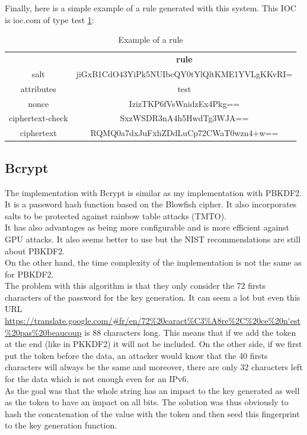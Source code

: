 \documentclass{eplmastersthesis}
\begin{document}
Finally, here is a simple example of a rule generated with this system. This IOC is ioc.com of type test \ref{Example-rule-pbkdf2}:
\begin{table}[]
\centering
\caption{Example of a rule}
\label{Example-rule-pbkdf2}
\begin{tabular}{cc}
{\textbf{}}  & {\textbf{rule}}                          \\
salt             & jiGxB1CdO43YiPk5NUIbcQY0tYlQltKME1YVLgKKvRI= \\
attributes       & test                                         \\
nonce            & IzizTKP6fVsWnidzEx4Pkg==                     \\
ciphertext-check & SxzWSDR3nA4h5HwdTg3WJA==                     \\
ciphertext       & RQMQ0a7dxJuFxhZDdLuCp72CWaT0wzn4+w==        
\end{tabular}
\end{table}

\subsection{Bcrypt}
The implementation with Bcrypt is similar as my implementation with PBKDF2. It is a password hash function based on the Blowfish cipher. It also incorporates salts to be protected against rainbow table attacks (TMTO).\\
It has also advantages as being more configurable and is more efficient against GPU attacks. It also seems better to use but the NIST recommendations are still about PBKDF2.\\

On the other hand, the time complexity of the implementation is not the same as for PBKDF2.\\
The problem with this algorithm is that they only consider the 72 firsts characters of the password for the key generation. It can seem a lot but even this URL \url{https://translate.google.com/#fr/en/72\%20caract\%C3\%A8re\%2C\%20ce\%20n'est\%20pas\%20beaucoup} is 88 characters long. This means that if we add the token at the end (like in PKKDF2) it will not be included. On the other side, if we first put the token before the data, an attacker would know that the 40 firsts characters will always be the same and moreover, there are only 32 characters left for the data which is not enough even for an IPv6.\\
As the goal was that the whole string has an impact to the key generated as well as the token to have an impact on all bits. The solution was thus obviously to hash the concatenation of the value with the token and then seed this fingerprint to the key generation function.\\
\end{document}

